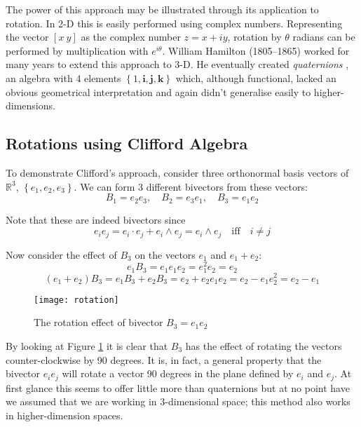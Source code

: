 The power of this approach may be illustrated through its application
to rotation. In 2-D this is easily performed using complex numbers. Representing
the vector $[x\ y]$ as the complex number $z = x + iy$, rotation by
$\theta$ radians can be performed by multiplication with $e^{i\theta}$.
William Hamilton (1805--1865) worked for many years to extend this approach
to 3-D. He eventually created \emph{quaternions} \cite{hamilton2,hamilton1},
an algebra with 4 
elements $\left\{1, \mathbf{i}, \mathbf{j}, \mathbf{k}\right\}$ which, although
functional, lacked an obvious geometrical interpretation and again didn't
generalise easily to higher-dimensions.

\subsection{Rotations using Clifford Algebra}

To demonstrate Clifford's approach, consider three orthonormal basis
vectors of $\mathbb{R}^3$, $\left\{e_1, e_2, e_3\right\}$. We can form
3 different bivectors from these vectors:
\begin{displaymath}
B_1 = e_2e_3,\quad B_2 = e_3e_1,\quad B_3 = e_1e_2
\end{displaymath}

Note that these are indeed bivectors since
\[
e_ie_j = e_i \cdot e_j + e_i \wedge e_j = e_i \wedge e_j \quad \mbox{iff} \quad i \ne j
\]

Now consider the effect of $B_3$ on the vectors $e_1$ and $e_1 + e_2$:
\begin{displaymath}
e_1B_3 = e_1e_1e_2 = e_1^2e_2=e_2 
\end{displaymath}
\begin{displaymath}
(e_1 + e_2)B_3 = e_1B_3 + e_2B_3 = e_2 + e_2e_1e_2 = e_2 - e_1e_2^2 = e_2 - e_1
\end{displaymath}

\begin{figure}
\centering
\texttt{[image: rotation]}
\caption{The rotation effect of bivector $B_3 = e_1e_2$\label{fig:rotation}}
\end{figure}

By looking at Figure \ref{fig:rotation} it is clear that $B_3$ has the
effect of rotating the vectors counter-clockwise by 90 degrees. It is, in
fact, a general property that the bivector $e_ie_j$ will rotate a
vector 90 degrees in the plane defined by $e_i$ and $e_j$. At first 
glance this seems to offer little more than quaternions but at no point 
have we assumed that we are working in 3-dimensional space; this method
also works in higher-dimension spaces.

